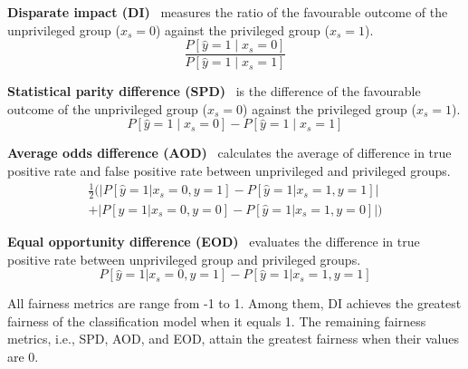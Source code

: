 \noindent \textbf{Disparate impact (DI)}~\cite{di} measures the ratio of the favourable outcome of the unprivileged group ($x_s=0$) against the privileged group ($x_s=1$). 
\begin{equation}
    \frac{P[\hat{y} = 1 \mid x_s = 0]}{P[\hat{y} = 1 \mid x_s = 1]}
\label{di-formula}
\end{equation}



\noindent \textbf{Statistical parity difference (SPD)}~\cite{spd} is the difference of the favourable outcome of the unprivileged group ($x_s=0$) against the privileged group ($x_s=1$). 
\begin{equation}
    P[\hat{y} = 1 \mid x_s = 0] - P[\hat{y} = 1 \mid x_s = 1]
\label{spd-formula}
\end{equation}

\noindent\textbf{Average odds difference (AOD)}~\cite{equal-op} calculates the average of difference in true positive rate and false positive rate between unprivileged and privileged groups. 
\begin{equation}
\begin{split}
    \frac{1}{2} (\lvert P[\hat{y} = 1|x_s = 0, y=1] - P[\hat{y} = 1|x_s = 1, y=1] \rvert \\
    +\lvert P[\hat{y} = 1|x_s = 0, y=0] - P[\hat{y} = 1|x_s = 1, y=0]\rvert)
\end{split}
\label{aod-formula}
\end{equation}


\noindent \textbf{Equal opportunity difference (EOD)}~\cite{equal-op} evaluates the difference in true positive rate between unprivileged group and privileged groups.
\begin{equation}
    P[\hat{y} = 1|x_s = 0, y=1] - P[\hat{y} = 1|x_s = 1, y=1]
\label{eod-formula}
\end{equation}

All fairness metrics are range from -1 to 1. Among them, DI achieves the greatest fairness of the classification model when it equals 1. The remaining fairness metrics, i.e., SPD, AOD, and EOD, attain the greatest fairness when their values are 0.




